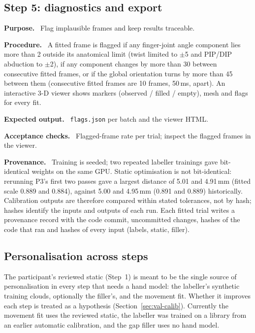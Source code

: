 \documentclass[11pt,a4paper]{article}
\newcommand{\field}[1]{\par\smallskip\noindent\textbf{#1.}\ }
\begin{document}
\subsection{Step 5: diagnostics and export}\label{sec:step-diag}
\field{Purpose} Flag implausible frames and keep results traceable.
\field{Procedure} A fitted frame is flagged if any finger-joint angle component lies more than 2\textdegree{} outside
its anatomical limit (twist limited to $\pm$5\textdegree{} and PIP/DIP abduction to $\pm$2\textdegree{}), if any
component changes by more than 30\textdegree{} between consecutive fitted frames, or if the global orientation turns
by more than 45\textdegree{} between them (consecutive fitted frames are 10 frames, 50\,ms, apart). An interactive 3-D
viewer shows markers (observed / filled / empty), mesh and flags for every fit.
\field{Expected output} \texttt{flags.json} per batch and the viewer HTML.
\field{Acceptance checks} Flagged-frame rate per trial; inspect the flagged frames in the viewer.
\field{Provenance} Training is seeded; two repeated labeller trainings gave bit-identical weights on the same GPU.
Static optimisation is not bit-identical: rerunning P3's first two passes gave a largest distance of 5.01 and 4.91\,mm
(fitted scale 0.889 and 0.884), against 5.00 and 4.95\,mm (0.891 and 0.889) historically. Calibration outputs are
therefore compared within stated tolerances, not by hash; hashes identify the inputs and outputs of each run. Each fitted
trial writes a provenance record with the code commit, uncommitted changes, hashes of the code that ran and hashes of
every input (labels, static, filler).

\subsection{Personalisation across steps}\label{sec:personalisation}
The participant's reviewed static (Step~1) is meant to be the single source of personalisation in every step that
needs a hand model: the labeller's synthetic training clouds, optionally the filler's, and the movement fit. Whether
it improves each step is treated as a hypothesis (Section~\ref{sec:val-calib}). Currently the movement fit uses the
reviewed static, the labeller was trained on a library from an earlier automatic calibration, and the gap filler uses
no hand model.

\end{document}
